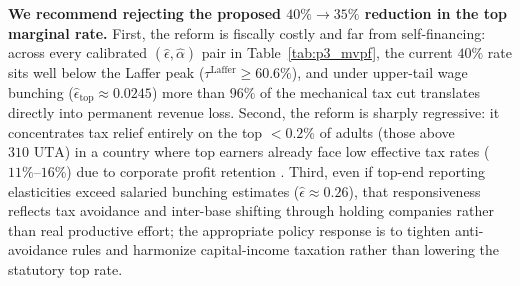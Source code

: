 \textbf{We recommend rejecting the proposed $40\% \to 35\%$ reduction in the top marginal rate.} First, the reform is fiscally costly and far from self-financing: across every calibrated $(\hat{\epsilon}, \hat{\alpha})$ pair in Table~\ref{tab:p3_mvpf}, the current $40\%$ rate sits well below the Laffer peak ($\tau^{\mathrm{Laffer}} \ge 60.6\%$), and under upper-tail wage bunching ($\hat{\epsilon}_{\mathrm{top}} \approx 0.0245$) more than $96\%$ of the mechanical tax cut translates directly into permanent revenue loss. Second, the reform is sharply regressive: it concentrates tax relief entirely on the top $<0.2\%$ of adults (those above $310\text{ UTA}$) in a country where top earners already face low effective tax rates ($11\%$--$16\%$) due to corporate profit retention \parencite{gutierrezNoExemption}. Third, even if top-end reporting elasticities exceed salaried bunching estimates ($\hat{\epsilon} \approx 0.26$), that responsiveness reflects tax avoidance and inter-base shifting through holding companies rather than real productive effort; the appropriate policy response is to tighten anti-avoidance rules and harmonize capital-income taxation rather than lowering the statutory top rate.